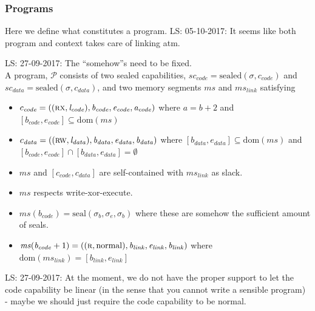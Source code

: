 \documentclass[a3paper]{article}
\newcommand\lau[1]{{\color{purple} \sf \footnotesize {LS: #1}}\\}
\newcommand{\dom}{\mathrm{dom}}
\newcommand{\shareddom}[1]{\mathrm{#1}}
\newcommand{\lin}{\var{l}}
\newcommand{\seal}[1]{\shareddom{seal}(#1)}
\newcommand{\sealed}[1]{\shareddom{sealed}(#1)}
\newcommand{\program}{\mathscr{P}}
\newcommand{\var}[1]{\mathit{#1}}
\newcommand{\ms}{\var{ms}}
\newcommand{\link}{\var{link}}
\newcommand{\data}{\var{data}}
\newcommand{\code}{\var{code}}
\newcommand{\vsc}{\var{sc}}
\newcommand{\baddr}{\var{b}}
\newcommand{\eaddr}{\var{e}}
\newcommand{\aaddr}{\var{a}}
\newcommand{\plainlinearity}[1]{\mathrm{#1}}
\newcommand{\normal}{\plainlinearity{normal}}
\newcommand{\plainperm}[1]{\textsc{#1}}
\newcommand{\rx}{\plainperm{rx}}
\newcommand{\rw}{\plainperm{rw}}
\newcommand{\readonly}{\plainperm{r}}
\newcommand{\ro}{\readonly}
\begin{document}
\subsubsection{Programs}
Here we define what constitutes a program.
\lau{05-10-2017: It seems like both program and context takes care of linking atm.}
\begin{definition}
  \label{def:program}
  \lau{27-09-2017: The ``somehow''s need to be fixed.}
  A program, $\program$ consists of two sealed capabilities, $\vsc_\code = \sealed{\sigma,c_\code}$ and $\vsc_\data = \sealed{\sigma,c_\data}$, and two memory segments $\ms$ and $\ms_\link$ satisfying
  \begin{itemize}
  \item $c_\code = ((\rx,\lin_\code),\baddr_\code,\eaddr_\code,\aaddr_\code)$ where $\aaddr = \baddr + 2$ and $[\baddr_\code,\eaddr_\code]\subseteq \dom(\ms)$
  \item $c_\data = ((\rw,\lin_\data),\baddr_\data,\eaddr_\data,\baddr_\data)$ where $[\baddr_\data,\eaddr_\data] \subseteq \dom(\ms)$ and $[\baddr_\code,\eaddr_\code] \cap [\baddr_\data,\eaddr_\data] = \emptyset$
  \item $\ms$ and $[c_\code,c_\data]$ are self-contained with $\ms_\link$ as slack.
  \item $\ms$ respects write-xor-execute.
  \item $\ms(\baddr_\code) = \seal{\sigma_\baddr,\sigma_\eaddr,\sigma_\baddr}$ where these are somehow the sufficient amount of seals.
  \item $\ms(\baddr_\code+1) = ((\ro,\normal),\baddr_\link, \eaddr_\link, \baddr_\link)$ where $\dom(\ms_\link) = [\baddr_\link, \eaddr_\link]$
  \end{itemize}
\end{definition}
\lau{27-09-2017: At the moment, we do not have the proper support to let the code capability be linear (in the sense that you cannot write a sensible program) - maybe we should just require the code capability to be normal.}
\end{document}
